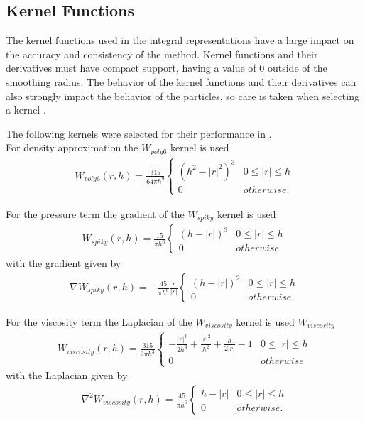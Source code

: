 \subsection{Kernel Functions}

The kernel functions used in the integral representations have a large impact
on the accuracy and consistency of the method. Kernel functions and their
derivatives must have compact support, having a value of 0 outside of the
smoothing radius. The behavior of the kernel functions and their derivatives
can also strongly impact the behavior of the particles, so care is taken when
selecting a kernel \cite{Liu2010}.

The following kernels were selected for their performance in \cite{Krog2010}.
\\
For density approximation the $W_{poly6}$ kernel is used
\begin{align}
W_{poly6}(r, h) = \frac{315}{64 \pi h^9} 
\begin{cases}
    (h^2 - |r|^2)^3 & \text{$0 \le |r| \le h$}
    \\
    0 & \text{$otherwise$}.
\end{cases}
\end{align}

For the pressure term the gradient of the  $W_{spiky}$ kernel is used
\begin{align}
W_{spiky}(r, h) = \frac{15}{\pi h^6} 
\begin{cases}
    (h - |r|)^3 & \text{$0 \le |r| \le h$}
    \\
    0 & \text{$otherwise$}
\end{cases}
\end{align}
with the gradient given by
\begin{align}
\nabla W_{spiky}(r, h) = -\frac{45}{\pi h^6} \frac{r}{|r|}
\begin{cases}
    (h - |r|)^2 & \text{$0 \le |r| \le h$}
    \\
    0 & \text{$otherwise$}.
\end{cases}
\end{align}

For the viscosity term the Laplacian of the $W_{viscosity}$ kernel is used
$W_{viscosity}$   
\begin{align}
W_{viscosity}(r, h) = \frac{315}{2 \pi h^3} 
\begin{cases}
    -\frac{|r|^3}{2h^3} + \frac{|r|^2}{h^2} + \frac{h}{2|r|} - 1 & \text{$0 \le |r| \le h$}
    \\
    0 & \text{$otherwise$}
\end{cases}
\end{align}
with the Laplacian given by
\begin{align}
\nabla^2 W_{viscosity}(r, h) = \frac{45}{\pi h^6}
\begin{cases}
    h - |r| & \text{$0 \le |r| \le h$}
    \\
    0 & \text{$otherwise$}.
\end{cases}
\end{align}

